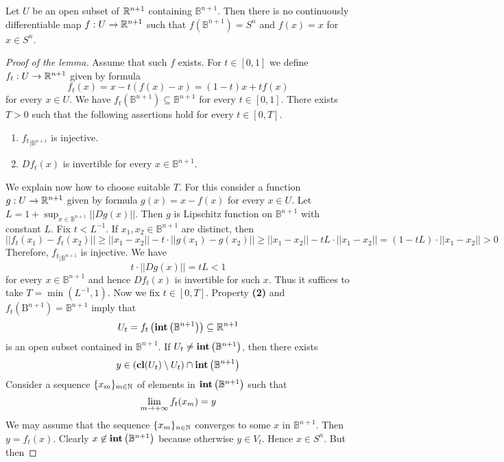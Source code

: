 \begin{lemma}\label{lemma:thereisnodifferentiableretraction}
Let $U$ be an open subset of ${\mathbb R}^{n+1}$ containing $\mathbb{B}^{n+1}$. Then there is no continuously differentiable map $f:U\rightarrow {\mathbb R}^{n+1}$ such that $f(\mathbb{B}^{n+1}) = S^{n}$ and $f(x) = x$ for $x\in S^n$. 
\end{lemma}
\begin{proof}[Proof of the lemma]
Assume that such $f$ exists. For $t\in [0,1]$ we define $f_t:U\rightarrow {\mathbb R}^{n+1}$ given by formula
$$f_t(x) = x - t(f(x) - x) = (1-t)x + tf(x)$$
for every $x\in U$. We have $f_t\left(\mathbb{B}^{n+1}\right) \subseteq \mathbb{B}^{n+1}$ for every $t\in [0,1]$. There exists $T>0$ such that the following assertions hold for every $t\in [0,T]$.
\begin{enumerate}[label=\textbf{(\arabic*)}, leftmargin=1.5em]
\item ${f_t}_{\mid \mathbb{B}^{n+1}}$ is injective.
\item $Df_t(x)$ is invertible for every $x\in \mathbb{B}^{n+1}$.
\end{enumerate}
We explain now how to choose suitable $T$. For this consider a function $g:U\rightarrow {\mathbb R}^{n+1}$ given by formula $g(x)= x - f(x)$ for every $x\in U$. Let $L = 1 + \sup_{x\in \mathbb{B}^{n+1}}||Dg(x)||$. Then $g$ is Lipschitz function on $\mathbb{B}^{n+1}$ with constant $L$. Fix $t < L^{-1}$. If $x_1,x_2\in \mathbb{B}^{n+1}$ are distinct, then
$$||f_t(x_1) - f_t(x_2)|| \geq ||x_1-x_2|| - t\cdot ||g(x_1) - g(x_2)|| \geq ||x_1 - x_2|| - tL\cdot ||x_1 - x_2|| = \left(1 - tL\right)\cdot ||x_1 - x_2|| > 0 $$
Therefore, ${f_t}_{\mid \mathbb{B}^{n+1}}$ is injective. We have
$$t\cdot ||Dg(x)|| = tL < 1$$
for every $x\in \mathbb{B}^{n+1}$ and hence $Df_t(x)$ is invertible for such $x$. Thus it suffices to take $T = \min \left(L^{-1}, 1 \right)$. Now we fix $t\in [0,T]$. Property \textbf{(2)} and $f_t\left(\mathrm{B}^{n+1}\right) = \mathbb{B}^{n+1}$ imply that
$$U_t = f_t\left(\mathbf{int}\left(\mathbb{B}^{n+1}\right)\right)\subseteq {\mathbb R}^{n+1}$$
is an open subset contained in $\mathbb{B}^{n+1}$. If $U_t \neq \mathbf{int}\left(\mathbb{B}^{n+1}\right)$, then there exists
$$y \in \left(\mathbf{cl}(U_t) \setminus U_t\right) \cap \mathbf{int}\left(\mathbb{B}^{n+1}\right)$$
Consider a sequence $\{x_m\}_{m\in {\mathbb N}}$ of elements in $\mathbf{int}\left(\mathbb{B}^{n+1}\right)$ such that
$$\lim_{m\rightarrow +\infty}f_t(x_m) = y$$
We may assume that the sequence $\{x_m\}_{n\in {\mathbb N}}$ converges to some $x$ in $\mathbb{B}^{n+1}$. Then $y = f_t(x)$. Clearly $x \not \in \mathbf{int}\left(\mathbb{B}^{n+1}\right)$ because otherwise $y \in V_t$. Hence $x\in S^n$. But then

\end{proof}
